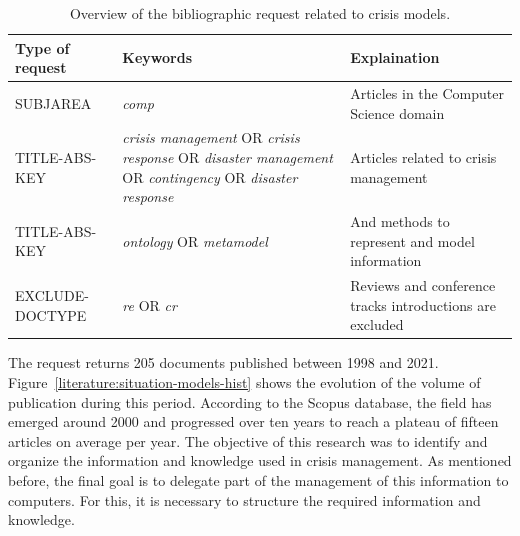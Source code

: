 \begin{table}[bht]
    \centering
    \tabulinesep=1.2mm
    \caption{Overview of the bibliographic request related to crisis models.}
    \begin{tabu} to \textwidth {X[0.5,r]X[1,m]X[1,m]}
        Type of request & Keywords                                                                                                                                     & Explaination                                             \\ [0.5ex]
        \toprule
        SUBJAREA        & \textit{comp}                                                                                                                                & Articles in the Computer Science domain                  \\
        TITLE-ABS-KEY   & \textit{crisis management} OR \textit{crisis response} OR \textit{disaster management} OR \textit{contingency} OR \textit{disaster response} & Articles related to crisis management                    \\
        TITLE-ABS-KEY   & \textit{ontology} OR \textit{metamodel}                                                                                                      & And methods to represent and model information           \\
        EXCLUDE-DOCTYPE & \textit{re} OR \textit{cr}                                                                                                                   & Reviews and conference tracks introductions are excluded \\
        \bottomrule
    \end{tabu}
    \label{table:crisis-models}
\end{table}

The request returns 205 documents published between 1998 and 2021.
Figure~\ref{literature:situation-models-hist} shows the evolution of the volume of publication during this period.
According to the Scopus database, the field has emerged around 2000 and progressed over ten years to reach a plateau of fifteen articles on average per year.
The objective of this research was to identify and organize the information and knowledge used in crisis management.
As mentioned before, the final goal is to delegate part of the management of this information to computers.
For this, it is necessary to structure the required information and knowledge.

